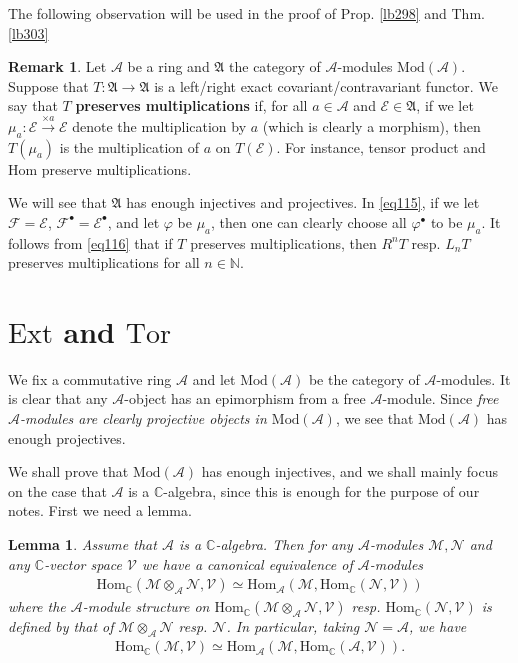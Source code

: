 \documentclass[12pt,b5paper,notitlepage]{report}
\theoremstyle{definition}
\newtheorem{rem}[df]{Remark}
\theoremstyle{plain}
\newtheorem{lm}[df]{Lemma}
\newcommand{\fk}{\mathfrak}
\newcommand{\mc}{\mathcal}
\newcommand{\Hom}{\mathrm{Hom}}
\newcommand{\blt}{\bullet}
\newcommand{\Cbb}{\mathbb C}
\newcommand{\Nbb}{\mathbb N}
\newcommand{\Ext}{\mathrm{Ext}}
\newcommand{\Tor}{\mathrm{Tor}}
\newcommand{\Mod}{\mathrm{Mod}}
\numberwithin{equation}{section}
\begin{document}
The following observation will be used in the proof of Prop. \ref{lb298} and Thm. \ref{lb303}

\begin{rem}\label{lb297}
Let $\mc A$ be a ring and $\fk A$ the category of $\mc A$-modules $\Mod(\mc A)$. Suppose that $T:\fk A\rightarrow\fk A$ is a left/right exact covariant/contravariant functor. We say that $T$ \textbf{preserves multiplications } if, for all $a\in\mc A$ and $\mc E\in\fk A$, if we let $\mu_a:\mc E\xrightarrow{\times a}\mc E$ denote the multiplication by $a$ (which is clearly a morphism), then $T(\mu_a)$ is the multiplication of $a$ on $T(\mc E)$. For instance, tensor product and $\Hom$ preserve multiplications.

We will see that $\fk A$ has enough injectives and projectives. In \eqref{eq115}, if we let $\mc F=\mc E$, $\mc F^\blt=\mc E^\blt$, and let $\varphi$ be $\mu_a$, then one can clearly choose all $\varphi^\blt$ to be $\mu_a$. It follows from \eqref{eq116} that if $T$ preserves multiplications, then $R^n T$ resp. $L_n T$ preserves multiplications for all $n\in\Nbb$.  \hfill\qedsymbol
\end{rem}



\section{$\Ext$ and $\Tor$}


We fix a commutative ring $\mc A$ and let $\Mod(\mc A)$ be the category of $\mc A$-modules. It is clear that any $\mc A$-object has an epimorphism from a free $\mc A$-module. Since \emph{\color{red}free $\mc A$-modules are clearly projective objects in $\Mod(\mc A)$}, we see that $\Mod(\mc A)$ has enough projectives.


We shall prove that $\Mod(\mc A)$ has enough injectives, and we shall mainly focus on the case that $\mc A$ is a $\Cbb$-algebra, since this is enough for the purpose of our notes. First we need a lemma.

\begin{lm}\label{lb255}
Assume that $\mc A$ is a $\Cbb$-algebra. Then for any $\mc A$-modules $\mc M,\mc N$ and any $\Cbb$-vector space $\mc V$ we have a canonical equivalence of $\mc A$-modules
\begin{align}
\Hom_\Cbb(\mc M\otimes_{\mc A}\mc N,\mc V)\simeq \Hom_{\mc A}(\mc M,\Hom_\Cbb(\mc N,\mc V)) \label{eq117}
\end{align}
where the $\mc A$-module structure on $\Hom_\Cbb(\mc M\otimes_{\mc A}\mc N,\mc V)$ resp. $\Hom_\Cbb(\mc N,\mc V)$ is defined by that of $\mc M\otimes_{\mc A}\mc N$ resp. $\mc N$. In particular, taking $\mc N=\mc A$, we have
\begin{align}
\Hom_\Cbb(\mc M,\mc V)\simeq \Hom_{\mc A}(\mc M,\Hom_\Cbb(\mc A,\mc V)).  \label{eq118}
\end{align}
\end{lm}
\end{document}
